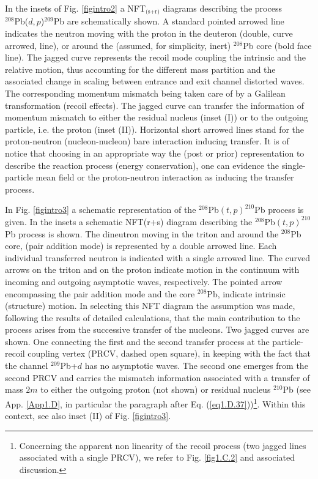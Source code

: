 In the insets of Fig. \ref{figintro2} a NFT$_{\text{(s+r)}}$  diagrams describing the process\\ \mbox{$^{208}$Pb($d,p$)$^{209}$Pb} are schematically shown. A standard pointed arrowed line indicates the neutron moving with the proton in the deuteron (double, curve arrowed, line), or around the (assumed, for simplicity, inert) $^{208}$Pb core (bold face line). The jagged curve represents the recoil  mode coupling the intrinsic and the relative motion,  thus accounting for the different mass partition  and the associated change in scaling between entrance and exit channel distorted waves. The corresponding momentum mismatch being taken care of by a  Galilean transformation (recoil effects). The jagged curve can transfer the information of momentum mismatch to either the residual nucleus (inset (I)) or to the outgoing particle, i.e. the proton (inset (II)).  Horizontal short arrowed lines stand for the proton-neutron (nucleon-nucleon) bare interaction inducing transfer. It is of notice that choosing in an appropriate way the (post or prior) representation to describe the reaction process (energy conservation), one can evidence the single-particle mean field or the proton-neutron interaction as inducing the transfer process.


In Fig. \ref{figintro3} a schematic representation of the $^{208}$Pb$(t,p)^{210}$Pb process is given. In the insets  a schematic NFT(r+s) diagram describing the $^{208}$Pb$(t,p)^{210}$Pb process is shown. The dineutron  moving in the triton and around the $^{208}$Pb core, (pair addition mode) is represented by a double arrowed line. Each individual transferred neutron is indicated with a single arrowed line. The curved arrows on the triton and on the proton indicate motion in the continuum with   incoming and outgoing asymptotic waves, respectively. The pointed arrow encompassing the pair addition mode and the core $^{208}$Pb, indicate intrinsic (structure) motion. In selecting this NFT diagram  the assumption was made, following the results of detailed calculations, that the main contribution to the process arises from the successive transfer of the nucleons. Two jagged curves are shown. One connecting the first and the second transfer process at the particle-recoil  coupling vertex (PRCV, dashed open square), in keeping with the fact that the channel $^{209}$Pb+$d$ has no asymptotic waves. The second one emerges from the second PRCV and carries the mismatch information associated with a transfer of mass $2m$ to either the outgoing proton (not shown) or residual nucleus $^{210}$Pb (see App. \ref{App1.D}, in particular the  paragraph after Eq. (\ref{eq1.D.37}))\footnote{Concerning the apparent non linearity of the recoil process (two jagged lines associated with a single PRCV), we refer to Fig. \ref{fig1.C.2} and associated discussion.}. Within this context, see also inset (II) of Fig. \ref{figintro3}. 

